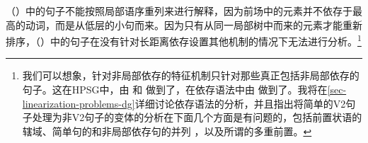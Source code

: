 \zl
（）中的句子不能按照局部语序重列来进行解释，因为前场中的元素并不依存于最高的动词，而是从低层的小句而来。因为只有从同一局部树中而来的元素才能重新排序，（）中的句子在没有针对长距离依存设置其他机制的情况下无法进行分析。\footnote{%
我们可以想象，针对非局部依存的特征机制只针对那些真正包括非局部依存的句子。这在HPSG\indexhpsgc 中，由 \citet{Kathol95a}和 \citet{Wetta2011a}做到了，在依存语法中由 \citet{GO2009a}做到了。我将在\ref{sec-linearization-problems-dg}详细讨论依存语法的分析，并且指出将简单的V2句子处理为非V2句子的变体的分析在下面几个方面是有问题的，包括前置状语的辖域、简单句的和非局部依存句的并列 ，以及所谓的多重前置。
}

